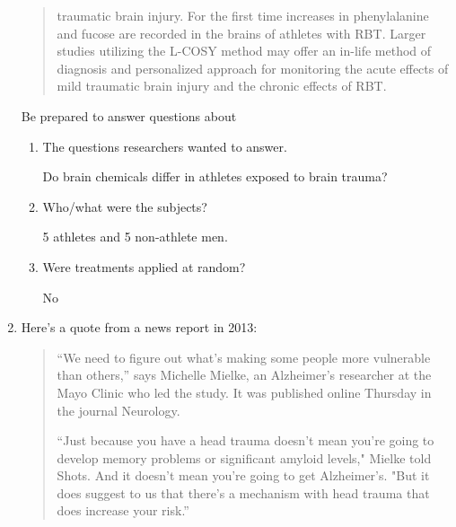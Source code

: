 \begin{enumerate}
{\begin{quotation}
traumatic brain injury. For the first time increases in phenylalanine
and fucose are recorded in the brains of athletes with RBT. Larger
studies utilizing the L-COSY method may offer an in-life method of
diagnosis and personalized approach for monitoring the acute effects
of mild traumatic brain injury and the chronic effects of RBT. 
\end{quotation}
}
 Be prepared to answer questions about 
\begin{enumerate}
\item  The questions researchers wanted to answer.
\begin{students}
 \vspace{1in}
\end{students}

\begin{key}
  Do brain chemicals differ in athletes exposed to brain trauma?
\end{key}


\item Who/what were the subjects?
\begin{students}
 \vspace{1cm}
\end{students}

\begin{key}
 5 athletes and 5 non-athlete men.
\end{key}



\item Were treatments applied at random?
\begin{students}
 \vspace{1cm}
\end{students}

\begin{key}
No
\end{key}

\end{enumerate}


\item Here's a quote from a news report in 2013:
{\footnotesize
  \begin{quotation}
    ``We need to figure out what's making some people more vulnerable
    than others,'' says Michelle Mielke, an Alzheimer's researcher at
    the Mayo Clinic who led the study. It was published online
    Thursday in the journal Neurology. 

``Just because you have a head trauma doesn't mean you're going to
develop memory problems or significant amyloid levels," Mielke told
Shots. And it doesn't mean you're going to get Alzheimer's. "But it
does suggest to us that there's a mechanism with head trauma that does
increase your risk.''


\end{quotation}}
\end{enumerate}
